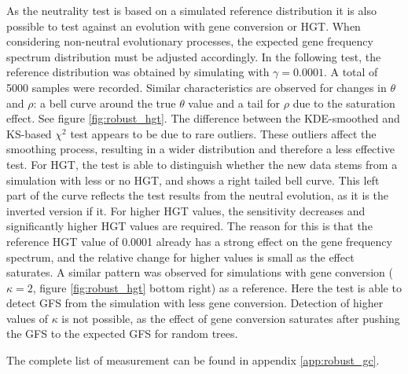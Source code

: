 As the neutrality test is based on a simulated reference distribution it is also possible to test against an evolution with gene conversion or \ac{HGT}.
When considering non-neutral evolutionary processes, the expected gene frequency spectrum distribution must be adjusted accordingly.
In the following test, the reference distribution was obtained by simulating with $\gamma = 0.0001$.
A total of 5000 samples were recorded.
Similar characteristics are observed for changes in $\theta$ and $\rho$: a bell curve around the true $\theta$ value and a tail for $\rho$ due to the saturation effect.
See figure \ref{fig:robust_hgt}.
The difference between the \ac{KDE}-smoothed and \ac{KS}-based $\chi^2$ test appears to be due to rare outliers.
These outliers affect the smoothing process, resulting in a wider distribution and therefore a less effective test.
For \ac{HGT}, the test is able to distinguish whether the new data stems from a simulation with less or no \ac{HGT}, and shows a right tailed bell curve.
This left part of the curve reflects the test results from the neutral evolution, as it is the inverted version if it.
For higher \ac{HGT} values, the sensitivity decreases and significantly higher \ac{HGT} values are required.
The reason for this is that the reference \ac{HGT} value of 0.0001 already has a strong effect on the gene frequency spectrum,
and the relative change for higher values is small as the effect saturates.
A similar pattern was observed for simulations with gene conversion ($\kappa = 2$, figure \ref{fig:robust_hgt} bottom right) as a reference.
Here the test is able to detect \ac{GFS} from the simulation with less gene conversion.
Detection of higher values of $\kappa$ is not possible, as the effect of gene conversion saturates after pushing the \ac{GFS} to the expected \ac{GFS} for random trees.

The complete list of measurement can be found in appendix \ref{app:robust_gc}.


